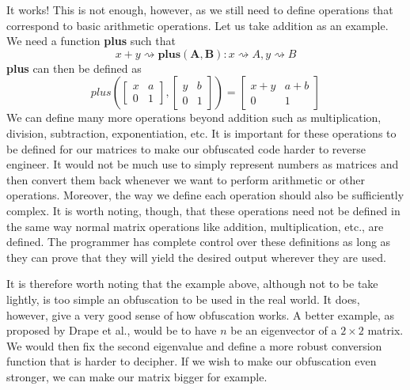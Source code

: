It works! This is not enough, however, as we still need to define operations
that correspond to basic arithmetic operations. Let us take addition as an
example. We need a function \textbf{plus} such that
\begin{equation*}
    x + y \rightsquigarrow \mathbf{plus(A, B)} : x \rightsquigarrow A, y
    \rightsquigarrow B
\end{equation*}
\textbf{plus} can then be defined as
\begin{equation*}
    plus\left(
    \begin{bmatrix}
        x & a \\
        0 & 1
    \end{bmatrix},
    \begin{bmatrix}
        y & b \\
        0 & 1
    \end{bmatrix}
    \right)
    =
    \begin{bmatrix}
        x + y & a + b \\
        0     & 1
    \end{bmatrix}
\end{equation*}
We can define many more operations beyond addition such as multiplication,
division, subtraction, exponentiation, etc. It is important for these
operations to be defined for our matrices to make our obfuscated code harder to
reverse engineer. It would not be much use to simply represent numbers as
matrices and then convert them back whenever we want to perform arithmetic or
other operations. Moreover, the way we define each operation should also be
sufficiently complex. It is worth noting, though, that these operations need
not be defined in the same way normal matrix operations like addition,
multiplication, etc., are defined. The programmer has complete control over
these definitions as long as they can prove that they will yield the desired
output wherever they are used.

It is therefore worth noting that the example above, although not to be take
lightly, is too simple an
obfuscation to be used in the real world. It does, however, give a very good
sense of how
obfuscation works. A better example, as proposed by Drape et al., would be to
have $ n $ be an eigenvector of a $ 2 \times 2 $ matrix. We would then fix the
second eigenvalue and define a more robust conversion function that is harder
to decipher. If we wish to make our obfuscation even stronger, we can make our
matrix bigger for example.



